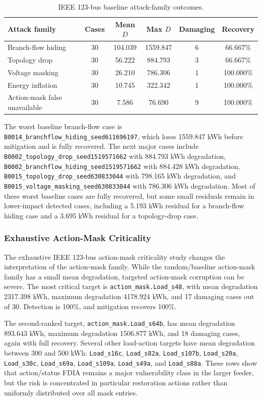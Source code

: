 \begin{table}[t]
\centering
\caption{IEEE 123-bus baseline attack-family outcomes.}
\label{tab:ieee123_attack_family}
\scriptsize
\begin{tabular}{lccccc}
\hline
Attack family & Cases & Mean $D$ & Max $D$ & Damaging & Recovery \\
\hline
Branch-flow hiding & 30 & 104.039 & 1559.847 & 6 & 66.667\% \\
Topology drop & 30 & 56.222 & 884.793 & 3 & 66.667\% \\
Voltage masking & 30 & 26.210 & 786.306 & 1 & 100.000\% \\
Energy inflation & 30 & 10.745 & 322.342 & 1 & 100.000\% \\
Action-mask false unavailable & 30 & 7.586 & 76.690 & 9 & 100.000\% \\
\hline
\end{tabular}
\end{table}

The worst baseline branch-flow case is \texttt{B0014\_branchflow\_hiding\_seed611696197}, which loses 1559.847 kWh before mitigation and is fully recovered. The next major cases include \texttt{B0002\_topology\_drop\_seed1519571662} with 884.793 kWh degradation, \texttt{B0002\_branchflow\_hiding\_seed1519571662} with 884.428 kWh degradation, \texttt{B0015\_topology\_drop\_seed630833044} with 798.165 kWh degradation, and \texttt{B0015\_voltage\_masking\_seed630833044} with 786.306 kWh degradation. Most of these worst baseline cases are fully recovered, but some small residuals remain in lower-impact detected cases, including a 5.193 kWh residual for a branch-flow hiding case and a 3.695 kWh residual for a topology-drop case.

\subsubsection{Exhaustive Action-Mask Criticality}
\label{subsubsec:ieee123_action_mask}

The exhaustive IEEE 123-bus action-mask criticality study changes the interpretation of the action-mask family. While the random/baseline action-mask family has a small mean degradation, targeted action-mask corruption can be severe. The most critical target is \texttt{action\_mask.Load\_s48}, with mean degradation 2317.398 kWh, maximum degradation 4178.924 kWh, and 17 damaging cases out of 30. Detection is 100\%, and mitigation recovers 100\%.

The second-ranked target, \texttt{action\_mask.Load\_s64b}, has mean degradation 893.643 kWh, maximum degradation 1506.877 kWh, and 18 damaging cases, again with full recovery. Several other load-action targets have mean degradation between 300 and 500 kWh: \texttt{Load\_s16c}, \texttt{Load\_s82a}, \texttt{Load\_s107b}, \texttt{Load\_s20a}, \texttt{Load\_s30c}, \texttt{Load\_s69a}, \texttt{Load\_s109a}, \texttt{Load\_s49a}, and \texttt{Load\_s88a}. These rows show that action/status FDIA remains a major vulnerability class in the larger feeder, but the risk is concentrated in particular restoration actions rather than uniformly distributed over all mask entries.

